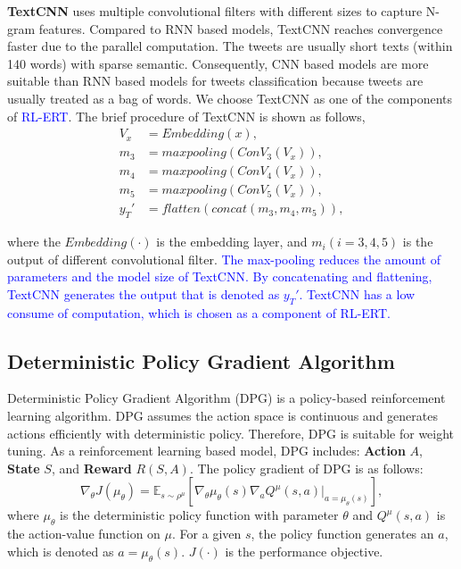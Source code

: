 \textbf{TextCNN} \cite{DBLP:conf/emnlp/Kim14} uses multiple convolutional filters with different sizes to capture N-gram features. Compared to RNN based models, TextCNN reaches convergence faster due to the parallel computation. The tweets are usually short texts (within 140 words) with sparse semantic. Consequently, CNN based models are more suitable than RNN based models for tweets classification because tweets are usually treated as a bag of words. We choose TextCNN as one of the components of \textcolor{blue}{RL-ERT}. The brief procedure of TextCNN is shown as follows,
\begin{align}\label{eq:tcnn}
V_x &= Embedding(x), \\
m_3 &= maxpooling(ConV_3(V_x)),\\
m_4 &= maxpooling(ConV_4(V_x)),\\
m_5 &= maxpooling(ConV_5(V_x)),\\
y_T' &= flatten(concat(m_3, m_4, m_5)),
\end{align}

where the $Embedding(\cdot)$ is the embedding layer, and $m_i (i = 3,4,5)$ is the output of different convolutional filter. \textcolor{blue}{The max-pooling reduces the amount of parameters and the model size of TextCNN. By concatenating and flattening, TextCNN generates the output that is denoted as $y_T'$. TextCNN has a low consume of computation, which is chosen as a component of RL-ERT.} 

\subsection{Deterministic Policy Gradient Algorithm}
Deterministic Policy Gradient Algorithm (DPG) \cite{DBLP:conf/icml/SilverLHDWR14} is a policy-based reinforcement learning algorithm. DPG assumes the action space is continuous and generates actions efficiently with deterministic policy. Therefore, DPG is suitable for weight tuning. As a reinforcement learning based model, DPG includes: \textbf{Action} $A$, \textbf{State} $S$, and \textbf{Reward} $R(S,A)$. The policy gradient of DPG is as follows:
\begin{equation}
\nabla_\theta J(\mu_\theta) =  \mathbb{E}_{s \sim \rho^\mu} \left[\nabla_\theta \mu_\theta (s)\nabla_a Q^\mu (s, a) |_{a = \mu_\theta(s)}  \right],
\end{equation}
where $\mu_\theta$ is the deterministic policy function with parameter $\theta$ and $Q^\mu(s, a)$ is the action-value function on $\mu$. For a given $s$, the policy function generates an $a$, which is denoted as $a=\mu_\theta(s)$. $J(\cdot)$ is the performance objective.
